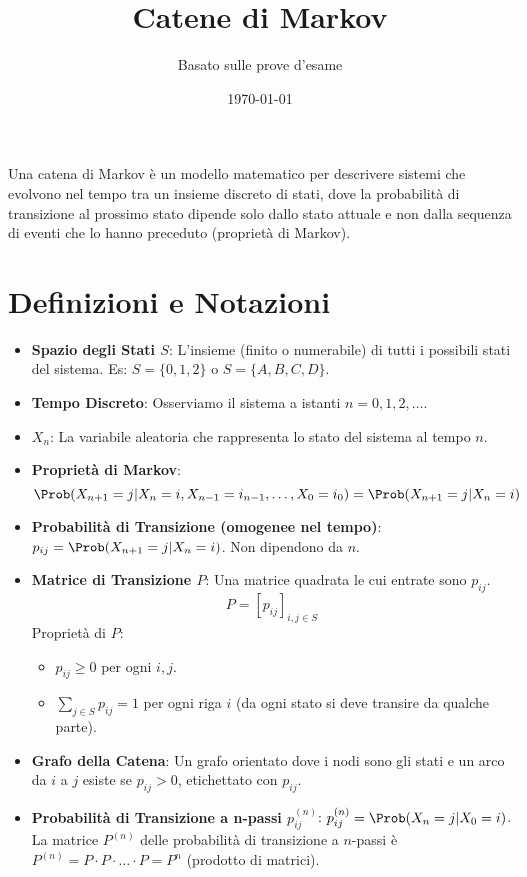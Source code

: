 

\title{Catene di Markov}
\author{Basato sulle prove d'esame}
\date{\today}



\maketitle
\tableofcontents
\newpage

\label{cap:markov}
Una catena di Markov è un modello matematico per descrivere sistemi che evolvono nel tempo tra un insieme discreto di stati, dove la probabilità di transizione al prossimo stato dipende solo dallo stato attuale e non dalla sequenza di eventi che lo hanno preceduto (proprietà di Markov).

\section{Definizioni e Notazioni}
\begin{itemize}
    \item \textbf{Spazio degli Stati $S$}: L'insieme (finito o numerabile) di tutti i possibili stati del sistema. Es: $S=\{0, 1, 2\}$ o $S=\{A, B, C, D\}$.
    \item \textbf{Tempo Discreto}: Osserviamo il sistema a istanti $n=0, 1, 2, \dots$.
    \item \textbf{$X_n$}: La variabile aleatoria che rappresenta lo stato del sistema al tempo $n$.
    \item \textbf{Proprietà di Markov}:
    \[ \Prob(X_{n+1}=j | X_n=i, X_{n-1}=i_{n-1}, \dots, X_0=i_0) = \Prob(X_{n+1}=j | X_n=i) \]
    \item \textbf{Probabilità di Transizione (omogenee nel tempo)}: $p_{ij} = \Prob(X_{n+1}=j | X_n=i)$. Non dipendono da $n$.
    \item \textbf{Matrice di Transizione $P$}: Una matrice quadrata le cui entrate sono $p_{ij}$.
    \[ P = [p_{ij}]_{i,j \in S} \]
    Proprietà di $P$:
    \begin{itemize}
        \item $p_{ij} \ge 0$ per ogni $i,j$.
        \item $\sum_{j \in S} p_{ij} = 1$ per ogni riga $i$ (da ogni stato si deve transire da qualche parte).
    \end{itemize}
    \item \textbf{Grafo della Catena}: Un grafo orientato dove i nodi sono gli stati e un arco da $i$ a $j$ esiste se $p_{ij}>0$, etichettato con $p_{ij}$.
    \item \textbf{Probabilità di Transizione a n-passi $p_{ij}^{(n)}$}: $p_{ij}^{(n)} = \Prob(X_n=j | X_0=i)$.
    La matrice $P^{(n)}$ delle probabilità di transizione a $n$-passi è $P^{(n)} = P \cdot P \cdot \dots \cdot P = P^n$ (prodotto di matrici).
\end{itemize}

